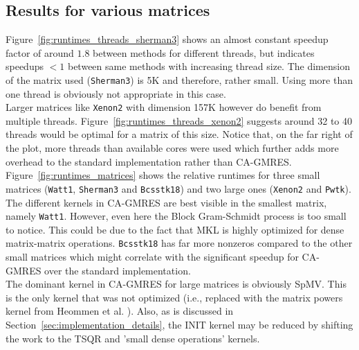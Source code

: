 \documentclass{scrartcl}
\numberwithin{equation}{section}
\begin{document}
\subsection{Results for various matrices}
Figure~\ref{fig:runtimes_threads_sherman3} shows an almost constant speedup factor of around $1.8$ between methods for different threads, but indicates speedups $< 1$ between same methods with increasing thread size. The dimension of the matrix used (\texttt{Sherman3}) is 5K and therefore, rather small. Using more than one thread is obviously not appropriate in this case.\\
Larger matrices like \texttt{Xenon2} with dimension 157K however do benefit from multiple threads. Figure~\ref{fig:runtimes_threads_xenon2} suggests around 32 to 40 threads would be optimal for a matrix of this size. Notice that, on the far right of the plot, more threads than available cores were used which further adds more overhead to the standard implementation rather than CA-GMRES.\\
Figure~\ref{fig:runtimes_matrices} shows the relative runtimes for three small matrices (\texttt{Watt1}, \texttt{Sherman3} and \texttt{Bcsstk18}) and two large ones (\texttt{Xenon2} and \texttt{Pwtk}). The different kernels in CA-GMRES are best visible in the smallest matrix, namely \texttt{Watt1}. However, even here the Block Gram-Schmidt process is too small to notice. This could be due to the fact that MKL is highly optimized for dense matrix-matrix operations. \texttt{Bcsstk18} has far more nonzeros compared to the other small matrices which might correlate with the significant speedup for CA-GMRES over the standard implementation.\\
The dominant kernel in CA-GMRES for large matrices is obviously SpMV. This is the only kernel that was not optimized (i.e., replaced with the matrix powers kernel from Heommen et al. \cite{Hoemmen:2010:CKS:1970638}). Also, as is discussed in Section~\ref{sec:implementation_details}, the INIT kernel may be reduced by shifting the work to the TSQR and 'small dense operations' kernels.
\end{document}
